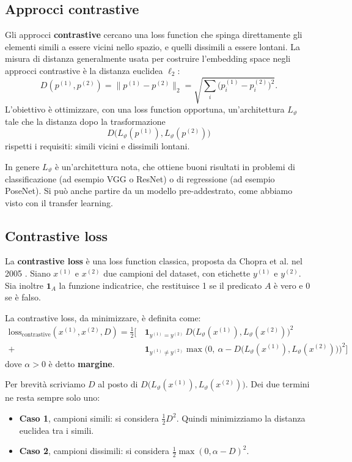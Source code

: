 \subsection{Approcci contrastive}
Gli approcci \textbf{contrastive} cercano una loss function che spinga direttamente gli elementi simili a essere vicini nello spazio, e quelli dissimili a essere lontani. La misura di distanza generalmente usata per costruire l'embedding space negli approcci contrastive è la distanza euclidea $\ell_2$:
\[
D(p^{(1)}, p^{(2)}) = \|p^{(1)} - p^{(2)}\|_2 = \sqrt{\sum_i \big(p_i^{(1)} - p_i^{(2)}\big)^2}.
\]
L'obiettivo è ottimizzare, con una loss function opportuna, un'architettura $L_\vartheta$ tale che la distanza dopo la trasformazione
\[
D\big(L_\vartheta(p^{(1)}), L_\vartheta(p^{(2)})\big)
\]
rispetti i requisiti: simili vicini e dissimili lontani.

In genere $L_\vartheta$ è un'architettura nota, che ottiene buoni risultati in problemi di classificazione (ad esempio VGG o ResNet) o di regressione (ad esempio PoseNet). Si può anche partire da un modello pre-addestrato, come abbiamo visto con il transfer learning.

\subsection{Contrastive loss}
La \textbf{contrastive loss} è una loss function classica, proposta da Chopra et al. nel 2005 \cite{Chopra2005}. Siano $x^{(1)}$ e $x^{(2)}$ due campioni del dataset, con etichette $y^{(1)}$ e $y^{(2)}$. Sia inoltre $\mathbf{1}_A$ la funzione indicatrice, che restituisce 1 se il predicato $A$ è vero e 0 se è falso.

\begin{definizione}
La contrastive loss, da minimizzare, è definita come:
\begin{align*}
\mathrm{loss}_{\mathrm{contrastive}}(x^{(1)}, x^{(2)}, D) = \frac{1}{2}\Big[\, &\mathbf{1}_{y^{(1)} = y^{(2)}}\, D\big(L_\vartheta(x^{(1)}), L_\vartheta(x^{(2)})\big)^2 \\
+\, &\mathbf{1}_{y^{(1)} \neq y^{(2)}} \max\big(0,\ \alpha - D\big(L_\vartheta(x^{(1)}), L_\vartheta(x^{(2)})\big)\big)^2 \Big]
\end{align*}
dove $\alpha > 0$ è detto \textbf{margine}.
\end{definizione}

Per brevità scriviamo $D$ al posto di $D\big(L_\vartheta(x^{(1)}), L_\vartheta(x^{(2)})\big)$. Dei due termini ne resta sempre solo uno:
\begin{itemize}
    \item \textbf{Caso 1}, campioni simili: si considera $\frac{1}{2}D^2$. Quindi minimizziamo la distanza euclidea tra i simili.
    \item \textbf{Caso 2}, campioni dissimili: si considera $\frac{1}{2}\max(0, \alpha - D)^2$.
\end{itemize}

